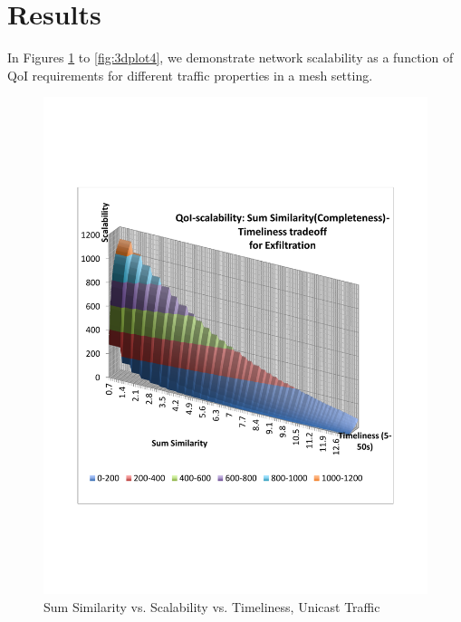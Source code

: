 \section{Results}
\label{sec:results}

In Figures \ref{fig:3dplot1} to \ref{fig:3dplot4}, we demonstrate network scalability as a function of QoI requirements for different traffic properties in a mesh setting.



\begin{figure}
    \includegraphics[scale=0.35]{figures/topk_uni.pdf}
    \caption{Sum Similarity vs. Scalability vs. Timeliness, Unicast Traffic}
    \label{fig:3dplot1}
\end{figure}


